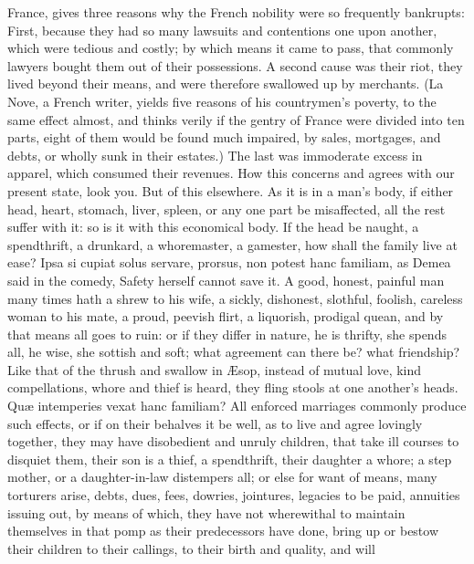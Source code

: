 {France, gives three reasons why the French nobility were so
frequently bankrupts: First, because they had so many lawsuits and
contentions one upon another, which were tedious and costly; by which
means it came to pass, that commonly lawyers bought them out of their
possessions. A second cause was their riot, they lived beyond their
means, and were therefore swallowed up by merchants. (La Nove, a French
writer, yields five reasons of his countrymen's poverty, to the same
effect almost, and thinks verily if the gentry of France were divided
into ten parts, eight of them would be found much impaired, by sales,
mortgages, and debts, or wholly sunk in their estates.) The last was
immoderate excess in apparel, which consumed their revenues. How this
concerns and agrees with our present state, look you. But of this
elsewhere. As it is in a man's body, if either head, heart, stomach,
liver, spleen, or any one part be misaffected, all the rest suffer with
it: so is it with this economical body. If the head be naught, a
spendthrift, a drunkard, a whoremaster, a gamester, how shall the
family live at ease? Ipsa si cupiat solus servare, prorsus, non
potest hanc familiam, as Demea said in the comedy, Safety herself
cannot save it. A good, honest, painful man many times hath a shrew to
his wife, a sickly, dishonest, slothful, foolish, careless woman to his
mate, a proud, peevish flirt, a liquorish, prodigal quean, and by that
means all goes to ruin: or if they differ in nature, he is thrifty, she
spends all, he wise, she sottish and soft; what agreement can there be?
what friendship? Like that of the thrush and swallow in \AE{}sop, instead
of mutual love, kind compellations, whore and thief is heard, they
fling stools at one another's heads. Qu\ae{} intemperies vexat hanc
familiam? All enforced marriages commonly produce such effects, or if
on their behalves it be well, as to live and agree lovingly together,
they may have disobedient and unruly children, that take ill courses to
disquiet them, their son is a thief, a spendthrift, their daughter
a whore; a step mother, or a daughter-in-law distempers all;
or else for want of means, many torturers arise, debts, dues,
fees, dowries, jointures, legacies to be paid, annuities issuing out,
by means of which, they have not wherewithal to maintain themselves in
that pomp as their predecessors have done, bring up or bestow their
children to their callings, to their birth and quality, and will
}
